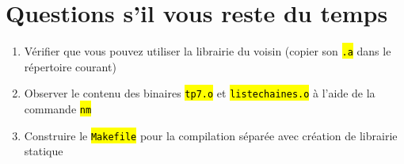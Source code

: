 \documentclass[final, a4paper, openbib, ]{article}
\let\OldTexttt\texttt
\renewcommand{\texttt}[1]{\OldTexttt{\hl{#1}}}
\begin{document}
\section{Questions s’il vous reste du temps}
\begin{enumerate}
	\item Vérifier que vous pouvez utiliser la librairie du voisin (copier son \texttt{.a} dans le répertoire courant)
	\item Observer le contenu des binaires \texttt{tp7.o} et \texttt{listechaines.o} à l'aide de la commande \texttt{nm}
	\item Construire le \texttt{Makefile} pour la compilation séparée avec création de librairie statique
\end{enumerate}


\end{document}
